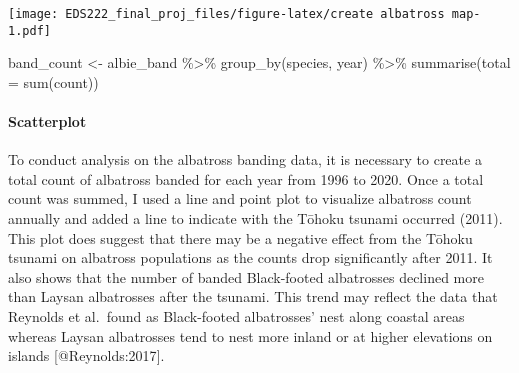 \documentclass[
]{article}
\newenvironment{Shaded}{\begin{snugshade}}{\end{snugshade}}
\newcommand{\AttributeTok}[1]{\textcolor[rgb]{0.77,0.63,0.00}{#1}}
\newcommand{\FunctionTok}[1]{\textcolor[rgb]{0.00,0.00,0.00}{#1}}
\newcommand{\NormalTok}[1]{#1}
\newcommand{\OtherTok}[1]{\textcolor[rgb]{0.56,0.35,0.01}{#1}}
\newcommand{\SpecialCharTok}[1]{\textcolor[rgb]{0.00,0.00,0.00}{#1}}
\begin{document}
\texttt{[image: EDS222\_final\_proj\_files/figure-latex/create albatross map-1.pdf]}

\begin{Shaded}
\begin{Highlighting}[]
\NormalTok{band\_count }\OtherTok{\textless{}{-}}\NormalTok{ albie\_band }\SpecialCharTok{\%\textgreater{}\%} 
  \FunctionTok{group\_by}\NormalTok{(species, year) }\SpecialCharTok{\%\textgreater{}\%} 
  \FunctionTok{summarise}\NormalTok{(}\AttributeTok{total =} \FunctionTok{sum}\NormalTok{(count))}
\end{Highlighting}
\end{Shaded}

\hypertarget{scatterplot}{%
\paragraph{Scatterplot}\label{scatterplot}}

To conduct analysis on the albatross banding data, it is necessary to
create a total count of albatross banded for each year from 1996 to
2020. Once a total count was summed, I used a line and point plot to
visualize albatross count annually and added a line to indicate with the
Tōhoku tsunami occurred (2011). This plot does suggest that there may be
a negative effect from the Tōhoku tsunami on albatross populations as
the counts drop significantly after 2011. It also shows that the number
of banded Black-footed albatrosses declined more than Laysan albatrosses
after the tsunami. This trend may reflect the data that Reynolds et
al.~found as Black-footed albatrosses' nest along coastal areas whereas
Laysan albatrosses tend to nest more inland or at higher elevations on
islands {[}@Reynolds:2017{]}.
\end{document}
